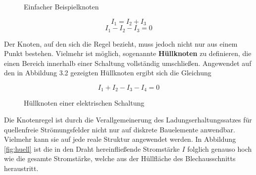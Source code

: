 \begin{frame}
{\begin{figure}[h!]
		{\caption{Einfacher Beispielknoten}}
		\label{fig:knoten}
	\end{figure}

	
		
		
	
		\begin{equation*}
			I_1 = I_2 + I_3
		\end{equation*}
		\begin{equation*}
			I_1 - I_2 - I_3 = 0
		\end{equation*}

		Der Knoten, auf den sich die Regel bezieht, muss jedoch nicht nur aus einem Punkt bestehen. 
		Vielmehr ist möglich, sogenannte \textbf{Hüllknoten} zu definieren, die einen Bereich 
		innerhalb einer Schaltung vollständig umschließen.
		Angewendet auf den in Abbildung 3.2
		gezeigten Hüllknoten ergibt sich die Gleichung

		\begin{equation*}
			I_1 + I_2 - I_3 - I_4 = 0
		\end{equation*}


\begin{figure}[h!]
	\begin{center}
		

	\end{center}
\label{fig:knoten2}
	\caption{Hüllknoten einer elektrischen Schaltung}
\end{figure}

Die Knotenregel ist durch die Verallgemeinerung des Ladungserhaltungssatzes für quellenfreie
Strömungsfelder nicht nur auf diskrete Bauelemente anwendbar. Vielmehr kann sie auf jede reale
Struktur angewendet werden. In Abbildung \ref{fig:huell} ist die in den Draht hereinfließende Stromstärke
$I$ folglich genauso hoch wie die gesamte Stromstärke, welche aus der Hüllfläche des Blechausschnitts heraustritt.



}
\end{frame}
